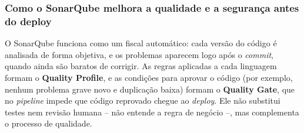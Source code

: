 \subsubsection{Como o SonarQube melhora a qualidade e a segurança antes do deploy}

O SonarQube funciona como um fiscal automático: cada versão do código é analisada de forma objetiva,
e os problemas aparecem logo após o \textit{commit}, quando ainda são baratos de corrigir. As regras
aplicadas a cada linguagem formam o \textbf{Quality Profile}, e as condições para aprovar o código
(por exemplo, nenhum problema grave novo e duplicação baixa) formam o \textbf{Quality Gate}, que no
\textit{pipeline} impede que código reprovado chegue ao \textit{deploy}. Ele não substitui testes nem
revisão humana -- não entende a regra de negócio --, mas complementa o processo de qualidade.
